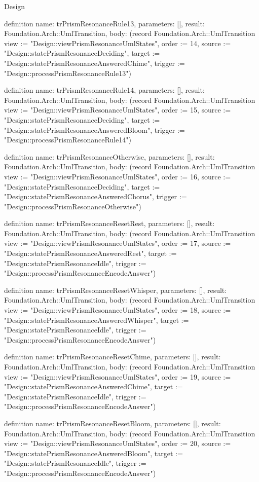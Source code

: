 \begin{lexlean}{Design}
\begin{semanticmodule}
definition{
  name: trPrismResonanceRule13,
  parameters: [],
  result: Foundation.Arch::UmlTransition,
  body: (record Foundation.Arch::UmlTransition {view := "Design::viewPrismResonanceUmlStates", order := 14, source := "Design::statePrismResonanceDeciding", target := "Design::statePrismResonanceAnsweredChime", trigger := "Design::processPrismResonanceRule13"})
}

definition{
  name: trPrismResonanceRule14,
  parameters: [],
  result: Foundation.Arch::UmlTransition,
  body: (record Foundation.Arch::UmlTransition {view := "Design::viewPrismResonanceUmlStates", order := 15, source := "Design::statePrismResonanceDeciding", target := "Design::statePrismResonanceAnsweredBloom", trigger := "Design::processPrismResonanceRule14"})
}

definition{
  name: trPrismResonanceOtherwise,
  parameters: [],
  result: Foundation.Arch::UmlTransition,
  body: (record Foundation.Arch::UmlTransition {view := "Design::viewPrismResonanceUmlStates", order := 16, source := "Design::statePrismResonanceDeciding", target := "Design::statePrismResonanceAnsweredChorus", trigger := "Design::processPrismResonanceOtherwise"})
}

definition{
  name: trPrismResonanceResetRest,
  parameters: [],
  result: Foundation.Arch::UmlTransition,
  body: (record Foundation.Arch::UmlTransition {view := "Design::viewPrismResonanceUmlStates", order := 17, source := "Design::statePrismResonanceAnsweredRest", target := "Design::statePrismResonanceIdle", trigger := "Design::processPrismResonanceEncodeAnswer"})
}

definition{
  name: trPrismResonanceResetWhisper,
  parameters: [],
  result: Foundation.Arch::UmlTransition,
  body: (record Foundation.Arch::UmlTransition {view := "Design::viewPrismResonanceUmlStates", order := 18, source := "Design::statePrismResonanceAnsweredWhisper", target := "Design::statePrismResonanceIdle", trigger := "Design::processPrismResonanceEncodeAnswer"})
}

definition{
  name: trPrismResonanceResetChime,
  parameters: [],
  result: Foundation.Arch::UmlTransition,
  body: (record Foundation.Arch::UmlTransition {view := "Design::viewPrismResonanceUmlStates", order := 19, source := "Design::statePrismResonanceAnsweredChime", target := "Design::statePrismResonanceIdle", trigger := "Design::processPrismResonanceEncodeAnswer"})
}

definition{
  name: trPrismResonanceResetBloom,
  parameters: [],
  result: Foundation.Arch::UmlTransition,
  body: (record Foundation.Arch::UmlTransition {view := "Design::viewPrismResonanceUmlStates", order := 20, source := "Design::statePrismResonanceAnsweredBloom", target := "Design::statePrismResonanceIdle", trigger := "Design::processPrismResonanceEncodeAnswer"})
}


\end{semanticmodule}
\end{lexlean}
